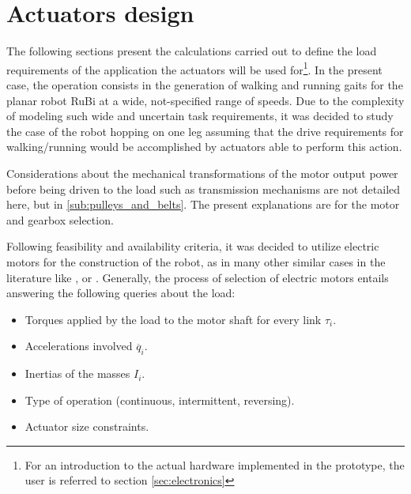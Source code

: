 
\section{Actuators design}
\label{sec_actuators}
The following sections present the calculations carried out to define the load requirements of the application the actuators will be used for\footnote{For an introduction to the actual hardware implemented in the prototype, the user is referred to section \ref{sec:electronics}}.
In the present case, the operation consists in the generation of walking and running gaits for the planar robot RuBi at a wide, not-specified range of speeds. 
Due to the complexity of modeling such wide and uncertain task requirements, it was decided to study the case of the robot hopping on one leg assuming that the drive requirements for walking/running would be accomplished by actuators able to perform this action.

Considerations about the mechanical transformations of the motor output power before being driven to the load such as transmission mechanisms are not detailed here, but in \ref{sub:pulleys_and_belts}.
The present explanations are for the motor and gearbox selection.

Following feasibility and availability criteria, it was decided to utilize electric motors for the construction of the robot, as in many other similar cases in the literature like \cite{runbot1}, \cite{phides} or \cite{biobiped}.
Generally, the process of selection of electric motors entails answering the following queries about the load:

\begin{itemize}
\label{list:motor_selection}
	\item Torques applied by the load to the motor shaft for every link $\tau_{i}$.
	\item Accelerations involved $\ddot{q_{i}}$.
	\item Inertias of the masses $I_{i}$.
	\item Type of operation (continuous, intermittent, reversing).
	\item Actuator size constraints.
\end{itemize}


